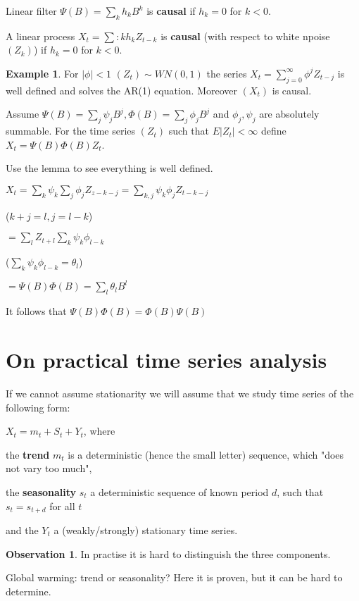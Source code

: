 \documentclass[12pt,a4paper]{amsart}
\theoremstyle{definition} %
\newtheorem{example}[defn]{Example}
\newtheorem{observation}[defn]{Observation}
\theoremstyle{plain} %
\begin{document}
Linear filter $\Psi(B) = \sum_k h_k B^k$ is {\bf causal} if $h_k = 0$ for $k < 0$. 

A linear process $X_t = \sum:k h_k Z_{t-k}$ is {\bf causal} (with respect to white npoise $(Z_k)$) if $h_k = 0$ for $k < 0$. 

\begin{example}
For $|\phi| < 1$ $(Z_t) \sim WN(0,1)$ the series $X_t = \sum_{j=0}^\infty \phi^j Z_{t-j}$ is well defined and solves the AR(1) equation. Moreover $(X_t)$ is causal. 
\end{example}

Assume 
$\Psi(B) = \sum_j \psi_j B^j, \Phi(B) = \sum_j \phi_j B^j$ and $\phi_j, \psi_j$ are absolutely summable. For the time series $(Z_t)$ such that $E|Z_t| < \infty$ define $X_t = \Psi(B) \Phi(B) Z_t$.

Use the lemma 
to see everything is well defined. 

$X_t = \sum_k \psi_k \sum_j \phi_j Z_{z-k-j} = \sum_{k,j} \psi_k \phi_j Z_{t-k-j}$

($k+j = l, j = l-k$)

$= \sum_l Z_{t+l} \sum_k \psi_k \phi_{l-k}$

($\sum_k \psi_k \phi_{l-k} = \theta_l$)

$= \Psi(B) 
\Phi(B) = \sum_l \theta_l B^l$

It follows that 
$\Psi(B) 
\Phi(B) = \Phi(B)
\Psi(B)$


\section{On practical time series analysis}
\vskip1cm


If we cannot assume stationarity we will assume that we study time series of the following form:

$X_t = m_t + S_t + Y_t$, where 

the {\bf trend} $m_t$ is a deterministic (hence the small letter) sequence, which "does not vary too much",

the {\bf seasonality} $s_t$ a deterministic sequence of known period $d$, such that $s_t = s_{t+d}$ for all $t$

and the $Y_t$ a (weakly/strongly) stationary time series.


\begin{observation}
In practise it is hard to distinguish the three components. 

Global warming: trend or seasonality? Here it is proven, but it can be hard to determine.
\end{observation}
\end{document}
